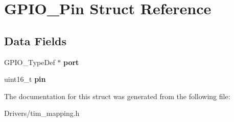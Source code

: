 \hypertarget{struct_g_p_i_o___pin}{}\section{G\+P\+I\+O\+\_\+\+Pin Struct Reference}
\label{struct_g_p_i_o___pin}
\subsection*{Data Fields}
\begin{DoxyCompactItemize}
\item 
\mbox{\label{struct_g_p_i_o___pin_a82241972e0292c7de95ea1e293e11be3}} 
G\+P\+I\+O\+\_\+\+Type\+Def $\ast$ {\bfseries port}
\item 
\mbox{\label{struct_g_p_i_o___pin_a4144813adfa4dfe7e7cbeea17d1b06eb}} 
uint16\+\_\+t {\bfseries pin}
\end{DoxyCompactItemize}


The documentation for this struct was generated from the following file\+:\begin{DoxyCompactItemize}
\item 
Drivers/tim\+\_\+mapping.\+h\end{DoxyCompactItemize}
